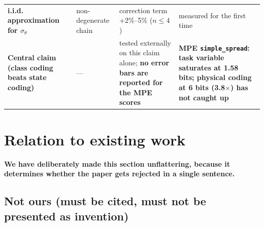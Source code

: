 \documentclass[11pt]{article}
\begin{document}
\begin{longtable}[]{@{}llll@{}}
\begin{minipage}[t]{0.22\columnwidth}
\textbf{i.i.d. approximation for \(\sigma_\theta\)}\strut
\end{minipage} & \begin{minipage}[t]{0.22\columnwidth}\raggedright
non-degenerate chain\strut
\end{minipage} & \begin{minipage}[t]{0.22\columnwidth}\raggedright
correction term +2\%--5\% (\(n\le4\))\strut
\end{minipage} & \begin{minipage}[t]{0.22\columnwidth}\raggedright
measured for the first time\strut
\end{minipage}\tabularnewline
\begin{minipage}[t]{0.22\columnwidth}\raggedright
\textbf{Central claim (class coding beats state coding)}\strut
\end{minipage} & \begin{minipage}[t]{0.22\columnwidth}\raggedright
---\strut
\end{minipage} & \begin{minipage}[t]{0.22\columnwidth}\raggedright
tested externally on this claim alone; \textbf{no error bars are reported for the MPE scores}\strut
\end{minipage} & \begin{minipage}[t]{0.22\columnwidth}\raggedright
\textbf{MPE \texttt{simple\_spread}: task variable saturates at 1.58 bits; physical coding at 6 bits (3.8\(\times\)) has not caught up}\strut
\end{minipage}\tabularnewline
\bottomrule
\end{longtable}

\hypertarget{relation-to-existing-work}{%
\section{Relation to existing work}\label{relation-to-existing-work}}

\textbf{We have deliberately made this section unflattering, because it determines whether the paper gets rejected in a single sentence.}

\hypertarget{not-ours-must-be-cited-must-not-be-presented-as-invention}{%
\subsection{Not ours (must be cited, must not be presented as invention)}\label{not-ours-must-be-cited-must-not-be-presented-as-invention}}
\end{document}
